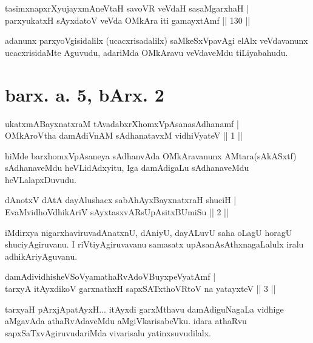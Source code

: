 \begin{shl}
tasimxnapxrXyujayxmAneV\s taH savoVR veVdaH sasaMgarxhaH   | \\
 parxyukatxH sAyxdatoV veVda OMkAra iti gamayxtAmf \hfill||  130 ||  
\end{shl}

\begin{artha}
adanunx parxyoVgisidalilx (ucacxrisadalilx) saMkeSxVpavAgi elAlx veVdavanunx ucacxrisidaMte Aguvudu, adariMda OMkAravu veVdaveMdu tiLiyabahudu.
\end{artha}

\centerline{}

\section*{barx. a. 5, bArx. 2}

\begin{shl}
ukatxmABayxnatxraM tAvadabxrXhomxVpAsanasAdhanamf | \\
OMkAroV\s tha damAdiVnAM sAdhanatavxM vidhiVyateV \hfill||  1 || 
\end{shl}

\begin{artha}
hiMde barxhomxVpAsaneya sAdhanvAda OMkAravanunx AMtara(sAkASxtf) sAdhanaveMdu heVLidAdxyitu, Iga damAdigaLu sAdhanaveMdu heVLalapxDuvudu. 
\end{artha}


\begin{shl}
dAnotxV dAtA dayAlushacx sabAhAyxBayxnatxraH shuciH | \\
EvaMvidhoV\s dhikAriV sAyxtasxvARsUpAsitxBUmiSu \hfill||  2 ||
\end{shl}

\begin{artha}
iMdirxya nigarxhaviruvadAnatxnU, dAniyU, dayALuvU saha oLagU  horagU shuciyAgiruvanu. I riVtiyAgiruvavanu samasatx upAsanAsAthxnagaLalulx iralu adhikAriyAguvanu.
\end{artha}

\begin{shl}
damAdividhisheVSoV\s yamathaRvAdoV\s BuyxpeVyatAmf  | \\
 tarxyA itAyxdikoV garxnathxH sapxSATxthoVR\s toV na yatayxteV ||  3 || 
\end{shl}

\begin{artha}
tarxyaH pArxjApatAyxH... itAyxdi garxMthavu damAdiguNagaLa vidhige aMgavAda athaRvAdaveMdu aMgiVkarisabeVku. idara athaRvu sapxSaTxvAgiruvudariMda vivarisalu yatinxsuvudilalx.
\end{artha}


